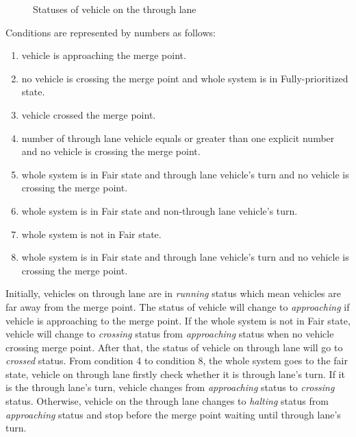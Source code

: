 \documentclass[10pt, conference, compsocconf]{IEEEtran}
\begin{document}
\begin{figure}[h]
\begin{center}
\end{center}
\caption{Statuses of vehicle on the through lane}
\label{throughLaneStatus}
\end{figure}

Conditions are represented by numbers as follows:
\begin{enumerate}[]
    \item vehicle is approaching the merge point. %
    \item no vehicle is crossing the merge point and whole system is in Fully-prioritized state. %
    \item vehicle crossed the merge point. %
    \item number of through lane vehicle equals or greater than one explicit number and no vehicle is crossing the merge point.  %
    \item whole system is in Fair state and through lane vehicle's turn and no vehicle is crossing the merge point. %
    \item whole system is in Fair state and non-through lane vehicle's turn. %
    \item whole system is not in Fair state. %
    \item whole system is in Fair state and through lane vehicle's turn and no vehicle is crossing the merge point. %
\end{enumerate}

Initially, vehicles on through lane are in \textit{running} status which mean vehicles are far away from the merge point. 
The status of vehicle will change to \textit{approaching} if vehicle is approaching to the merge point.
If the whole system is not in Fair state, vehicle will change to \textit{crossing} status from \textit{approaching} status when no vehicle crossing merge point. 
After that, the status of vehicle on through lane will go to \textit{crossed} status. 
From condition 4 to condition 8, the whole system goes to the fair state, vehicle on through lane firstly check whether it is through lane's turn. 
If it is the through lane's turn, vehicle changes from \textit{approaching} status to \textit{crossing} status. 
Otherwise, vehicle on the through lane changes to \textit{halting} status from \textit{approaching} status and stop before the merge point waiting until through lane's turn.
\end{document}
